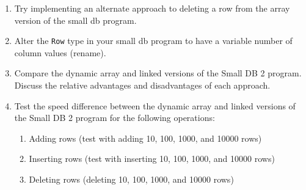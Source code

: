 \begin{enumerate}
  \item Try implementing an alternate approach to deleting a row from the array version of the small db program.
  \item Alter the \texttt{Row} type in your small db program to have a variable number of column values (rename).
  \item Compare the dynamic array and linked versions of the Small DB 2 program. Discuss the relative advantages and disadvantages of each approach.
  \item Test the speed difference between the dynamic array and linked versions of the Small DB 2 program for the following operations:
  \begin{enumerate}
    \item Adding rows (test with adding 10, 100, 1000, and 10000 rows)
    \item Inserting rows (test with inserting 10, 100, 1000, and 10000 rows)
    \item Deleting rows (deleting 10, 100, 1000, and 10000 rows)
  \end{enumerate}
\end{enumerate}

